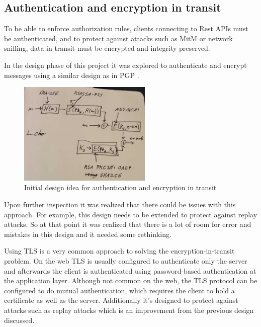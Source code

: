 \documentclass[11pt]{article}
\begin{document}
\begin{flushleft}
\subsection{Authentication and encryption in transit}

To be able to enforce authorization rules, clients connecting to Rest APIs must be authenticated, and to protect against attacks such as MitM or network sniffing, data in transit must be encrypted and integrity preserved.

In the design phase of this project it was explored to authenticate and encrypt messages using a similar design as in PGP \cite{pgpdesign}.

\begin{figure}[h!]
	\begin{center}
		\includegraphics[width = 240px]{images/inspired_by_pgp_cropped.jpg}
		\caption{Initial design idea for authentication and encryption in transit}
		\label{fig:inspired_by_pgp}
	\end{center}
\end{figure}

Upon further inspection it was realized that there could be issues with this approach. For example, this design needs to be extended to protect against replay attacks. So at that point it was realized that there is a lot of room for error and mistakes in this design and it needed some rethinking.

Using TLS is a very common approach to solving the encryption-in-transit problem. On the web TLS is usually configured to authenticate only the server and afterwards the client is authenticated using password-based authentication at the application layer. Although not common on the web, the TLS protocol can be configured to do mutual authentication, which requires the client to hold a certificate as well as the server. Additionally it's designed to protect against attacks such as replay attacks \cite{TODO: find citation} which is an improvement from the previous design discussed.


\end{flushleft}
\end{document}
